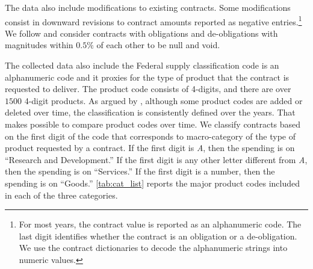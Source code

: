 \documentclass[dv_diss_main.tex]{subfiles}
\begin{document}
The data also include modifications to existing contracts. Some modifications consist in downward revisions to contract amounts reported as negative entries.\footnote{For most years, the contract value is reported as an alphanumeric code. The last digit identifies whether the contract is an obligation or a de-obligation. We use the contract dictionaries to decode the alphanumeric strings into numeric values.} We follow \cite{Auerbach2020} and consider contracts with obligations and de-obligations with magnitudes within $0.5\%$ of each other to be null and void. 


\iffalse
We follow two approaches to allocate the military spending for a contract across years. The first approach consists of assigning the entire value of the contract to the year in which the contract has been signed. The second approach follows \cite{Auerbach2020} and it smooths the allocation of the contract value over the duration of the contract, computed as the period between the signature date and the completion date.\footnote{As in this second approach, we need to calculate the period passed between the signature and the completion dates, we remove contracts with missing completion dates or with completion dates before the signature dates.} As the empirical analysis is carried at the annual frequency, we then aggregate the value of a contract by the years covered between the signature and the completion years.
\fi 

The collected data also include the Federal supply classification code is an alphanumeric code and it proxies for the type of product that the contract is requested to deliver. The product code consists of 4-digits, and there are over $1500$ 4-digit products. As argued by \cite{Draca2013}, although some product codes are added or deleted over time, the classification is consistently defined over the years. That makes possible to compare product codes over time. We classify contracts based on the first digit of the code that corresponds to macro-category of the type of product requested by a contract. If the first digit is \textit{A}, then the spending is on ``Research and Development.'' If the first digit is any other letter different from \textit{A}, then the spending is on ``Services.'' If the first digit is a number, then the spending is on ``Goods.'' \ref{tab:cat_list} reports the major product codes included in each of the three categories.
\end{document}
